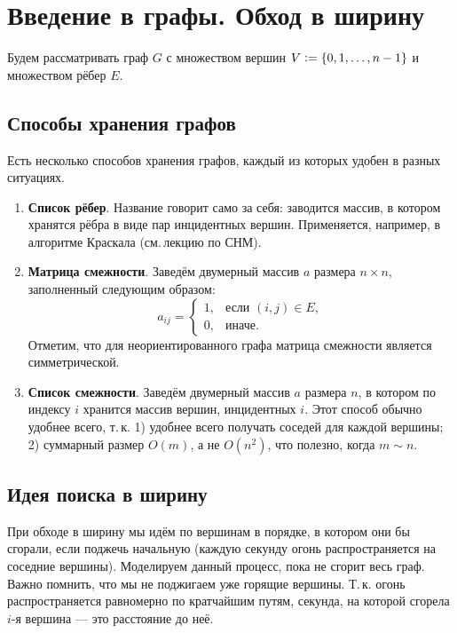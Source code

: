 \section{Введение в графы. Обход в ширину}

Будем рассматривать граф $G$ с множеством вершин $V \vcentcolon = \{0, 1, \ldots, n \hm - 1\}$ и множеством рёбер $E$. 

\subsection{Способы хранения графов}

Есть несколько способов хранения графов, каждый из которых удобен в разных ситуациях.

\begin{enumerate}
    \item \textbf{Список рёбер}. Название говорит само за себя: заводится массив, в котором хранятся рёбра в виде пар инцидентных вершин. Применяется, например, в алгоритме Краскала (см.\,лекцию по СНМ).
    \item \textbf{Матрица смежности}. Заведём двумерный массив $a$ размера $n \times n$, заполненный следующим образом:
    \[
    a_{ij} =
    \begin{cases}
        1,&\text{если $(i, j) \in E$},\\
        0,&\text{иначе}.
    \end{cases}
    \]
    Отметим, что для неориентированного графа матрица смежности является симметрической.
    \item \textbf{Список смежности}. Заведём двумерный массив $a$ размера $n$, в котором по индексу $i$ хранится массив вершин, инцидентных $i$. Этот способ обычно удобнее всего, т.\,к. 1) удобнее всего получать соседей для каждой вершины; 2) суммарный размер $O(m)$, а не $O(n^2)$, что полезно, когда $m \sim n$.
\end{enumerate}

\subsection{Идея поиска в ширину}

При обходе в ширину мы идём по вершинам в порядке, в котором они бы сгорали, если поджечь начальную (каждую секунду огонь распространяется на соседние вершины). Моделируем данный процесс, пока не сгорит весь граф. Важно помнить, что мы не поджигаем уже горящие вершины. Т.\,к. огонь распространяется равномерно по кратчайшим путям, секунда, на которой сгорела $i$-я вершина --- это расстояние до неё.

